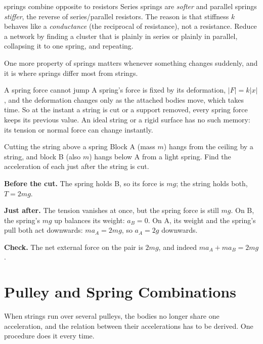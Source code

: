 \begin{trapbox}{springs combine opposite to resistors}
Series springs are \emph{softer} and parallel springs \emph{stiffer}, the reverse of series/parallel
resistors. The reason is that stiffness $k$ behaves like a \emph{conductance} (the reciprocal of
resistance), not a resistance. Reduce
a network by finding a cluster that is plainly in series or plainly in parallel, collapsing it to one
spring, and repeating.
\end{trapbox}

One more property of springs matters whenever something changes suddenly, and it is where springs
differ most from strings.

\begin{keybox}{A spring force cannot jump}
A spring's force is fixed by its deformation, $|F|=k|x|$, and the deformation changes only as the
attached bodies move, which takes time. So at the instant a string is cut or a support removed, every
spring force keeps its previous value. An ideal string or a rigid surface has no such memory: its
tension or normal force can change instantly.
\end{keybox}

\begin{exbox}{Cutting the string above a spring}\label{ex:cutspring}
Block A (mass $m$) hangs from the ceiling by a string, and block B (also $m$) hangs below A from a light
spring. Find the acceleration of each just after the string is cut.

 \textbf{Before the cut.} The spring holds B, so its force is $mg$; the string holds both, $T=2mg$.

 \textbf{Just after.} The tension vanishes at once, but the spring force is still $mg$. On B,
the spring's $mg$ up balances its weight: $a_B=0$. On A, its weight and the spring's pull both act
downwards: $ma_A=2mg$, so $a_A=2g$ downwards.

 \textbf{Check.} The net external force on the pair is $2mg$, and indeed $ma_A+ma_B=2mg$.
\end{exbox}

\section{Pulley and Spring Combinations}

When strings run over several pulleys, the bodies no longer share one acceleration, and the relation
between their accelerations has to be derived. One procedure does it every time.

